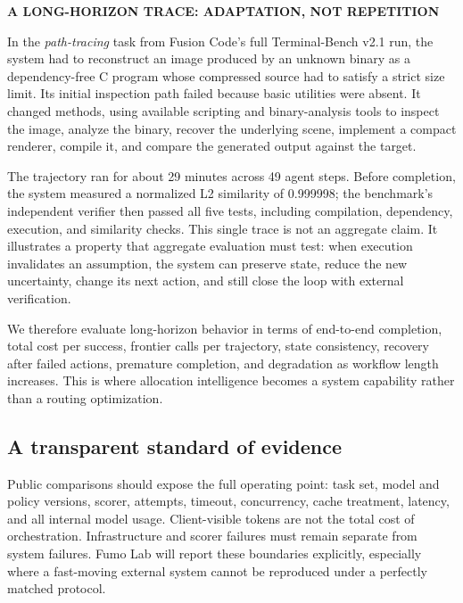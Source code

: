 \begin{tcolorbox}[
  enhanced,
  breakable,
  colback=fusionpaper,
  colframe=fusionpaper,
  boxrule=0pt,
  arc=2pt,
  left=11pt,right=11pt,top=9pt,bottom=9pt
]
{\sffamily\bfseries\color{fusionink}A LONG-HORIZON TRACE: ADAPTATION,
NOT REPETITION}\par\smallskip
In the \emph{path-tracing} task from Fusion Code's full Terminal-Bench v2.1
run, the system had to reconstruct an image produced by an unknown binary as a
dependency-free C program whose compressed source had to satisfy a strict size
limit. Its initial inspection path failed because basic utilities were absent.
It changed methods, using available scripting and binary-analysis tools to
inspect the image, analyze the binary, recover the underlying scene, implement
a compact renderer, compile it, and compare the generated output against the
target.

The trajectory ran for about 29 minutes across 49 agent steps. Before
completion,
the system measured a normalized L2 similarity of 0.999998; the benchmark's
independent verifier then passed all five tests, including compilation,
dependency, execution, and similarity checks. This single trace is not an
aggregate claim. It illustrates a property that aggregate evaluation must test:
when execution invalidates an assumption, the system can preserve state,
reduce the new uncertainty, change its next action, and still close the loop
with external verification.
\end{tcolorbox}

We therefore evaluate long-horizon behavior in terms of end-to-end completion,
total cost per success, frontier calls per trajectory, state consistency,
recovery after failed actions, premature completion, and degradation as
workflow length increases. This is where allocation intelligence becomes a
system capability rather than a routing optimization.

\subsection{A transparent standard of evidence}

Public comparisons should expose the full operating point: task set, model and
policy versions, scorer, attempts, timeout, concurrency, cache treatment,
latency, and all internal model usage. Client-visible tokens are not the total
cost of orchestration. Infrastructure and scorer failures must remain separate
from system failures. Fumo Lab will report these boundaries explicitly,
especially where a fast-moving external system cannot be reproduced under a
perfectly matched protocol.
